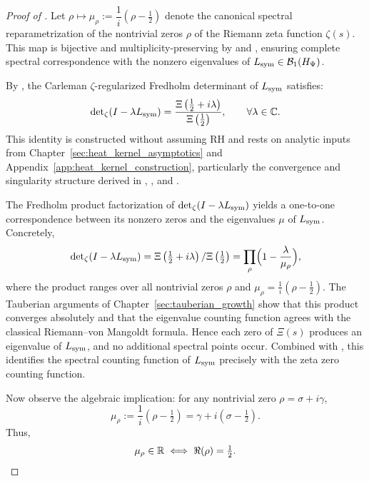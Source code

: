 \begin{proof}[Proof of ]
Let \( \rho \mapsto \mu_\rho := \dfrac{1}{i}(\rho - \tfrac{1}{2}) \) denote the canonical spectral reparametrization of the nontrivial zeros \( \rho \) of the Riemann zeta function \( \zeta(s) \). This map is bijective and multiplicity-preserving by  and , ensuring complete spectral correspondence with the nonzero eigenvalues of \( L_{\mathrm{sym}} \in \mathcal{B}_1(H_{\Psi}) \).

\medskip

By , the Carleman \(\zeta\)-regularized Fredholm determinant of \( L_{\mathrm{sym}} \) satisfies:
\[
\det\nolimits_{\zeta}(I - \lambda L_{\mathrm{sym}}) = \frac{\Xi\left( \tfrac{1}{2} + i\lambda \right)}{\Xi\left( \tfrac{1}{2} \right)},
\qquad \forall \lambda \in \mathbb{C}.
\]
This identity is constructed without assuming RH and rests on analytic inputs from Chapter~\ref{sec:heat_kernel_asymptotics} and Appendix~\ref{app:heat_kernel_construction}, particularly the convergence and singularity structure derived in , , and .

The Fredholm product factorization of \(\det\nolimits_{\zeta}(I-\lambda L_{\mathrm{sym}})\) yields a one-to-one correspondence between its nonzero zeros and the eigenvalues \(\mu\) of \(L_{\mathrm{sym}}\).  Concretely,
\begin{equation*}
\det\nolimits_{\zeta}(I-\lambda L_{\mathrm{sym}}) = \Xi\left(\tfrac{1}{2}+i\lambda\right)/\Xi\left(\tfrac{1}{2}\right) = \prod_{\rho} \Bigl(1-\frac{\lambda}{\mu_{\rho}}\Bigr),
\end{equation*}
where the product ranges over all nontrivial zeros \(\rho\) and \(\mu_{\rho} = \tfrac{1}{i}(\rho-\tfrac{1}{2})\).  The Tauberian arguments of Chapter~\ref{sec:tauberian_growth} show that this product converges absolutely and that the eigenvalue counting function agrees with the classical Riemann--von Mangoldt formula.  Hence each zero of \(\Xi(s)\) produces an eigenvalue of \(L_{\mathrm{sym}}\), and no additional spectral points occur.  Combined with , this identifies the spectral counting function of \(L_{\mathrm{sym}}\) precisely with the zeta zero counting function.

\medskip

Now observe the algebraic implication: for any nontrivial zero \( \rho = \sigma + i\gamma \),
\[
\mu_\rho := \frac{1}{i}(\rho - \tfrac{1}{2}) = \gamma + i(\sigma - \tfrac{1}{2}).
\]
Thus,
\[
\mu_\rho \in \mathbb{R} \iff \Re(\rho) = \tfrac{1}{2}.
\]


\end{proof}

